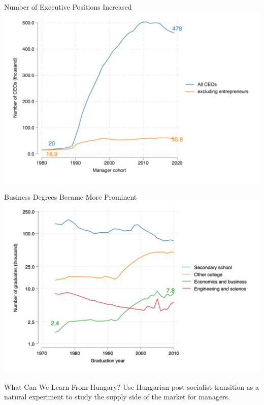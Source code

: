 \documentclass[
  ignorenonframetext,
  aspectratio=1610,
]{beamer}
\begin{document}
\begin{frame}{Number of Executive Positions Increased}
\protect\hypertarget{number-of-executive-positions-increased}{}
\includegraphics{fig/ceo-stock.png}
\end{frame}

\begin{frame}{Business Degrees Became More Prominent}
\protect\hypertarget{business-degrees-became-more-prominent}{}
\includegraphics{fig/school-graduates.png}
\end{frame}

\begin{frame}{What Can We Learn From Hungary?}
\protect\hypertarget{what-can-we-learn-from-hungary}{}
Use Hungarian post-socialist transition as a natural experiment to study
the supply side of the market for managers.
\end{frame}
\end{document}
